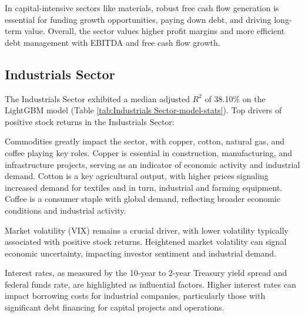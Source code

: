 \documentclass[12pt,a4paper,english]{article}
\begin{document}
In capital-intensive sectors like materials, robust free cash flow generation is essential for funding growth opportunities, paying down debt, and driving long-term value. Overall, the sector values higher profit margins and more efficient debt management with EBITDA and free cash flow growth.

\subsection{Industrials Sector}
\label{sec:industrials}

The Industrials Sector exhibited a median adjusted $R^2$ of 38.10\% on the LightGBM model (Table \ref{tab:Industrials Sector-model-stats}). Top drivers of positive stock returns in the Industrials Sector:


Commodities greatly impact the sector, with copper, cotton, natural gas, and coffee playing key roles. Copper is essential in construction, manufacturing, and infrastructure projects, serving as an indicator of economic activity and industrial demand. Cotton is a key agricultural output, with higher prices signaling increased demand for textiles and in turn, industrial and farming equipment. Coffee is a consumer staple with global demand, reflecting broader economic conditions and industrial activity.

Market volatility (VIX) remains a crucial driver, with lower volatility typically associated with positive stock returns. Heightened market volatility can signal economic uncertainty, impacting investor sentiment and industrial demand.

Interest rates, as measured by the 10-year to 2-year Treasury yield spread and federal funds rate, are highlighted as influential factors. Higher interest rates can impact borrowing costs for industrial companies, particularly those with significant debt financing for capital projects and operations.
\end{document}
